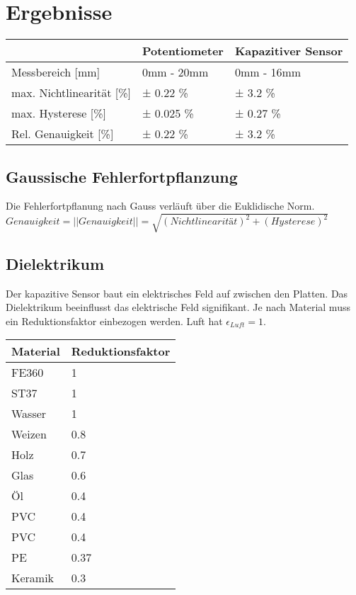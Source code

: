 \section{Ergebnisse}

\begin{tabular}{ l | l | l}
    \hline
                              & Potentiometer  & Kapazitiver Sensor  \\ \hline
    Messbereich [mm]          & 0mm - 20mm     & 0mm - 16mm          \\ \hline
    max. Nichtlinearität [\%] & ± 0.22 \%      & ± 3.2 \%            \\ \hline
    max. Hysterese [\%]       & ± 0.025 \%     & ± 0.27 \%           \\ \hline
    Rel. Genauigkeit [\%]     & ± 0.22 \%      & ± 3.2 \%            \\ \hline
\end{tabular}

\vspace*{1em}
\subsection{Gaussische Fehlerfortpflanzung}
Die Fehlerfortpflanung nach Gauss verläuft über die Euklidische Norm. \\
\hspace{3cm}
$Genauigkeit = || Genauigkeit || = \sqrt{(Nichtlinearität)^2 + (Hysterese)^2}$



\subsection{Dielektrikum}
Der kapazitive Sensor baut ein elektrisches Feld auf zwischen den Platten. Das Dielektrikum beeinflusst das elektrische Feld signifikant. Je nach Material muss ein Reduktionsfaktor einbezogen werden. Luft hat $\epsilon_{Luft} = 1$.
\begin{tabular}{| l | l |}
    \hline
    Material  & Reduktionsfaktor \\
    \hline
    FE360     & 1\\
    ST37      & 1\\
    Wasser    & 1\\
    Weizen    & 0.8\\
    Holz      & 0.7\\
    Glas      & 0.6\\
    Öl        & 0.4\\
    PVC       & 0.4\\
    PVC       & 0.4\\
    PE        & 0.37\\
    Keramik   & 0.3 \\
    \hline
\end{tabular}

\vspace*{1em}

\clearpage

